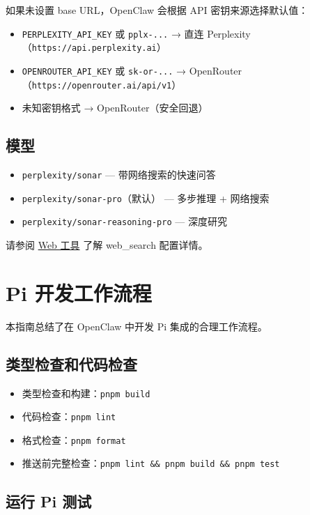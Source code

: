 如果未设置 base URL，OpenClaw 会根据 API 密钥来源选择默认值：

\begin{itemize}
  \item \texttt{PERPLEXITY\_API\_KEY} 或 \texttt{pplx-...} → 直连 Perplexity（\texttt{https://api.perplexity.ai}）
  \item \texttt{OPENROUTER\_API\_KEY} 或 \texttt{sk-or-...} → OpenRouter（\texttt{https://openrouter.ai/api/v1}）
  \item 未知密钥格式 → OpenRouter（安全回退）
\end{itemize}


\subsection{模型}


\begin{itemize}
  \item \texttt{perplexity/sonar} — 带网络搜索的快速问答
  \item \texttt{perplexity/sonar-pro}（默认） — 多步推理 + 网络搜索
  \item \texttt{perplexity/sonar-reasoning-pro} — 深度研究
\end{itemize}


请参阅 \href{/tools/web}{Web 工具} 了解 web\_search 配置详情。


\clearpage

\section{Pi 开发工作流程}


本指南总结了在 OpenClaw 中开发 Pi 集成的合理工作流程。

\subsection{类型检查和代码检查}


\begin{itemize}
  \item 类型检查和构建：\texttt{pnpm build}
  \item 代码检查：\texttt{pnpm lint}
  \item 格式检查：\texttt{pnpm format}
  \item 推送前完整检查：\texttt{pnpm lint \&\& pnpm build \&\& pnpm test}
\end{itemize}


\subsection{运行 Pi 测试}


